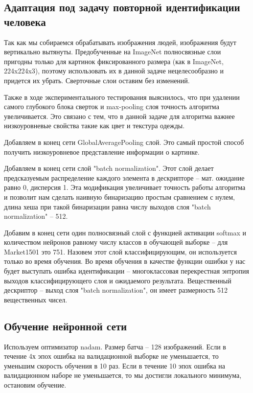 \documentclass[a4paper]{article}
\begin{document}
\begin{multicols*}{2}
\subsection{Адаптация под задачу повторной идентификации человека}

Так как мы собираемся обрабатывать изображения людей, изображения будут вертикально вытянуты. Предобученные на ImageNet полносвязные слои пригодны только для картинок фиксированного размера (как в ImageNet, 224x224x3), поэтому использовать их в данной задаче нецелесообразно и придется их убрать. Сверточные слои оставим без изменений.

Также в ходе экспериментального тестирования выяснилось, что при удалении самого глубокого блока сверток и max-pooling слоя точность алгоритма увеличивается. Это связано с тем, что в данной задаче для алгоритма важнее низкоуровневые свойства такие как цвет и текстура одежды.

Добавляем в конец сети GlobalAveragePooling слой. Это самый простой способ получить низкоуровневое представление информации о картинке.

Добавляем в конец сети слой "batch normalization"\cite{batchnormalization}. Этот слой делает предсказуемым распределение каждого элемента в дескрипторе -- мат. ожидание равно 0, дисперсия 1. Эта модификация увеличивает точность работы алгоритма и позволит нам сделать наивную бинаризацию простым сравнением с нулем, длина хеша при такой бинаризации равна числу выходов слоя "batch normalization" -- 512.

Добавим в конец сети один полносвязный слой с функцией активации softmax и количеством нейронов равному числу классов в обучающей выборке -- для Market1501\cite{market1501} это 751. Назовем этот слой классифицирующим, он используется только во время обучения. Во время обучения в качестве функции ошибки у нас будет выступать ошибка идентификации -- многоклассовая перекрестная энтропия выходов классифицирующего слоя и ожидаемого результата. Вещественный дескриптор -- выход слоя "batch normalization", он имеет размерность 512 вещественных чисел.

\subsection{Обучение нейронной сети}

Используем оптимизатор nadam\cite{nadam}. Размер батча -- 128 изображений. Если в течение 4х эпох ошибка на валидационной выборке не уменьшается, то уменьшим скорость обучения в 10 раз. Если в течение 10 эпох ошибка на валидационном наборе не уменьшается, то мы достигли локального минимума, остановим обучение.


\end{multicols*}
\end{document}
